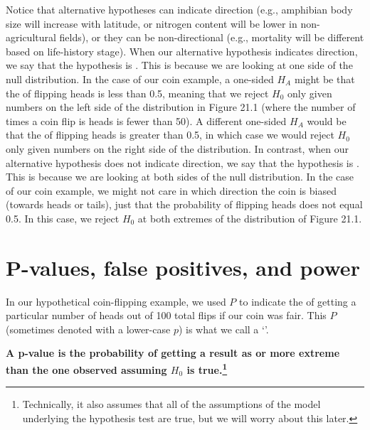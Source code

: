 \documentclass[
  openany]{krantz}
\renewenvironment{quote}{\begin{VF}}{\end{VF}}
\begin{document}
Notice that alternative hypotheses can indicate direction (e.g., amphibian body size will increase with latitude, or nitrogen content will be lower in non-agricultural fields), or they can be non-directional (e.g., mortality will be different based on life-history stage).
When our alternative hypothesis indicates direction, we say that the hypothesis is \textbf{}.
This is because we are looking at one side of the null distribution.
In the case of our coin example, a one-sided \(H_{A}\) might be that the  of flipping heads is less than 0.5, meaning that we reject \(H_{0}\) only given numbers on the left side of the distribution in Figure 21.1 (where the number of times a coin flip is heads is fewer than 50).
A different one-sided \(H_{A}\) would be that the  of flipping heads is greater than 0.5, in which case we would reject \(H_{0}\) only given numbers on the right side of the distribution.
In contrast, when our alternative hypothesis does not indicate direction, we say that the hypothesis is \textbf{}.
This is because we are looking at both sides of the null distribution.
In the case of our coin example, we might not care in which direction the coin is biased (towards heads or tails), just that the probability of flipping heads does not equal 0.5.
In this case, we reject \(H_{0}\) at both extremes of the distribution of Figure 21.1.

\hypertarget{p-values-false-positives-and-power}{%
\section{P-values, false positives, and power}\label{p-values-false-positives-and-power}}

In our hypothetical coin-flipping example, we used \(P\) to indicate the  of getting a particular number of heads out of 100 total flips if our coin was fair.
This \(P\) (sometimes denoted with a lower-case \(p\)) is what we call a `'.

\begin{quote}
\textbf{A p-value is the probability of getting a result as or more extreme than the one observed assuming \(H_{0}\) is true.\footnote{Technically, it also assumes that all of the assumptions of the model underlying the hypothesis test are true, but we will worry about this later.}}
\end{quote}
\end{document}
